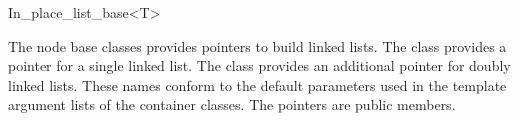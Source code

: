 

\begin{ccRefClass}{In_place_list_base<T>}
  
  \ccDefinition The node base classes provides pointers to build
  linked lists. The class  provides
  a pointer  for a single linked list. The class
   provides an additional pointer
   for doubly linked lists. These names conform to
  the default parameters used in the template argument lists of the
  container classes. The pointers are public members.


  \ccGlue
\end{ccRefClass}

